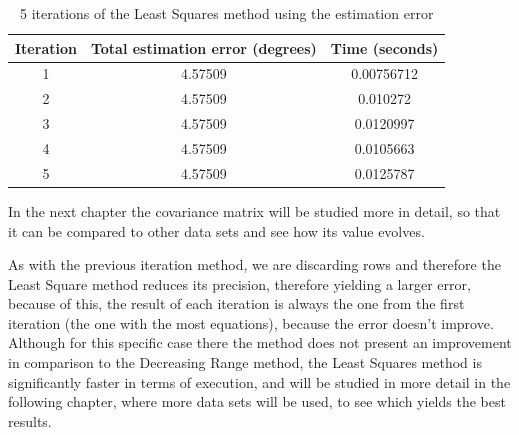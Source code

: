 \begin{table}[h!]
	\centering
	\def\arraystretch{1.2}
	\begin{tabular}{|c c c|} 
		\hline
		Iteration & Total estimation error (degrees) & Time (seconds) \\ [0.5ex] 
		\hline\hline
		1  & 4.57509 & 0.00756712 \\
		\hline
		2  & 4.57509 & 0.010272 \\
		\hline
		3  & 4.57509 & 0.0120997 \\
		\hline
		4  & 4.57509 & 0.0105663 \\
		\hline
		5  & 4.57509 & 0.0125787 \\
		\hline
	\end{tabular}
	\caption{5 iterations of the Least Squares method using the estimation error}
\end{table}

In the next chapter the covariance matrix will be studied more in detail, so that it can be compared to other data sets and see how its value evolves.

As with the previous iteration method, we are discarding rows and therefore the Least Square method reduces its precision, therefore yielding a larger error, because of this, the result of each iteration is always the one from the first iteration (the one with the most equations), because the error doesn't improve. \\

Although for this specific case there the method does not present an improvement in comparison to the Decreasing Range method, the Least Squares method is significantly faster in terms of execution, and will be studied in more detail in the following chapter, where more data sets will be used, to see which yields the best results.
